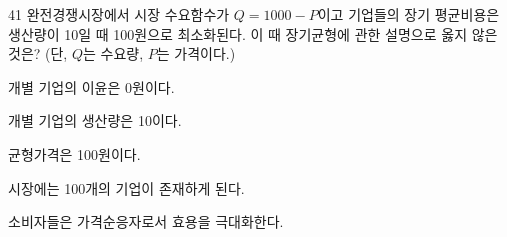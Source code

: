 \begin{question}{41}
완전경쟁시장에서 시장 수요함수가 $Q=1000-P$이고 기업들의 장기 평균비용은 생산량이 10일 때 100원으로 최소화된다. 이 때 장기균형에 관한 설명으로 옳지 않은 것은? (단, $Q$는 수요량, $P$는 가격이다.)
\begin{choices}
  \item 개별 기업의 이윤은 0원이다.
  \item 개별 기업의 생산량은 10이다.
  \item 균형가격은 100원이다.
  \item 시장에는 100개의 기업이 존재하게 된다.
  \item 소비자들은 가격순응자로서 효용을 극대화한다.
\end{choices}
\end{question}
